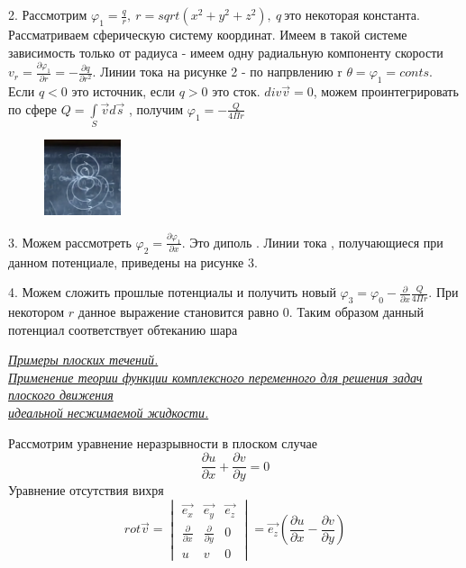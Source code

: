 2. Рассмотрим $\varphi_1 = \frac{q}{r}, \ r = sqrt(x^2+y^2+z^2), \ q \ \text{это некоторая константа}$. Рассматриваем сферическую систему координат. Имеем в такой системе зависимость только от радиуса - имеем одну радиальную компоненту скорости $v_r = \frac {\partial \varphi_1 } {\partial r}= -\frac{\partial q}{\partial r^2}.$ Линии тока  на рисунке  2 - по напрвлению r $\theta = \varphi_1 = conts$. Если $q < 0$ это источник, если $q > 0$ это сток. $div \overrightarrow{v} = 0$, можем проинтегрировать по  сфере $Q = \int\limits_{S} \overrightarrow{v} d \overrightarrow{s} $ , получим $\varphi_1 =- \frac{Q}{4\Pi r}$

\begin{figure}
	\includegraphics[width=0.2\textwidth]{14/pic_3.png}
	\caption{\label{ris:image14.3}}
\end{figure}

3. Можем рассмотреть $\varphi_2 = \frac{\partial \varphi_1} {\partial x}$.  Это диполь . Линии тока , получающиеся при данном потенциале, приведены на рисунке 3.


4. Можем сложить прошлые потенциалы и получить новый $\varphi_3 = \varphi_0 - \frac{\partial}{\partial x} \frac{Q}{4\Pi r}$. При некотором  $r$ данное выражение становится равно 0. Таким образом данный потенциал соответствует обтеканию шара

\newpage 

\begin{center}
	\textit{\underline{Примеры плоских течений. }}
	\\
	\textit{\underline{Применение теории функции комплексного
		 		переменного для решения задач плоского движения }}
	 \\
	 \textit{\underline{ идеальной несжимаемой жидкости. }}
\end{center}

Рассмотрим уравнение неразрывности в плоском случае 
$$
\frac{\partial u}{\partial x} + \frac{\partial v}{\partial y} = 0
$$
Уравнение отсутствия вихря 
$$
rot \overrightarrow{v} = 
\begin{vmatrix}
	\overrightarrow{e_x} & \overrightarrow{e_y}  & \overrightarrow{e_z} \\
	\frac{\partial }{\partial x} & \frac{\partial }{\partial y} & 0\\
	u & v & 0\
\end{vmatrix} = \overrightarrow{e_z} (\frac{\partial u}{\partial x} - \frac{\partial v}{\partial y} )
$$

